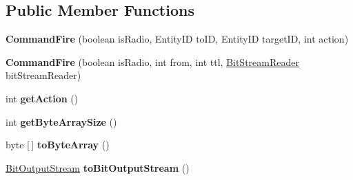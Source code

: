 \subsection*{Public Member Functions}
\begin{DoxyCompactItemize}
\item 
\hypertarget{classadf_1_1agent_1_1communication_1_1standard_1_1bundle_1_1topdown_1_1CommandFire_a096f6d1f59e59d3e50d4aaa81627ffe5}{}\label{classadf_1_1agent_1_1communication_1_1standard_1_1bundle_1_1topdown_1_1CommandFire_a096f6d1f59e59d3e50d4aaa81627ffe5} 
{\bfseries Command\+Fire} (boolean is\+Radio, Entity\+ID to\+ID, Entity\+ID target\+ID, int action)
\item 
\hypertarget{classadf_1_1agent_1_1communication_1_1standard_1_1bundle_1_1topdown_1_1CommandFire_a7a3979249cfbe7491fcb6a25ba3b7260}{}\label{classadf_1_1agent_1_1communication_1_1standard_1_1bundle_1_1topdown_1_1CommandFire_a7a3979249cfbe7491fcb6a25ba3b7260} 
{\bfseries Command\+Fire} (boolean is\+Radio, int from, int ttl, \hyperlink{classadf_1_1component_1_1communication_1_1util_1_1BitStreamReader}{Bit\+Stream\+Reader} bit\+Stream\+Reader)
\item 
\hypertarget{classadf_1_1agent_1_1communication_1_1standard_1_1bundle_1_1topdown_1_1CommandFire_ac5b6f3774aba7df932872d62aa5a4562}{}\label{classadf_1_1agent_1_1communication_1_1standard_1_1bundle_1_1topdown_1_1CommandFire_ac5b6f3774aba7df932872d62aa5a4562} 
int {\bfseries get\+Action} ()
\item 
\hypertarget{classadf_1_1agent_1_1communication_1_1standard_1_1bundle_1_1topdown_1_1CommandFire_a31d8677dededcf55229510bb013d4258}{}\label{classadf_1_1agent_1_1communication_1_1standard_1_1bundle_1_1topdown_1_1CommandFire_a31d8677dededcf55229510bb013d4258} 
int {\bfseries get\+Byte\+Array\+Size} ()
\item 
\hypertarget{classadf_1_1agent_1_1communication_1_1standard_1_1bundle_1_1topdown_1_1CommandFire_abbcfbbd10848d3ec6d5ed0ce3f6074c0}{}\label{classadf_1_1agent_1_1communication_1_1standard_1_1bundle_1_1topdown_1_1CommandFire_abbcfbbd10848d3ec6d5ed0ce3f6074c0} 
byte \mbox{[}$\,$\mbox{]} {\bfseries to\+Byte\+Array} ()
\item 
\hypertarget{classadf_1_1agent_1_1communication_1_1standard_1_1bundle_1_1topdown_1_1CommandFire_a4e69239f9f8c5c6ad6b381ac5eff2ded}{}\label{classadf_1_1agent_1_1communication_1_1standard_1_1bundle_1_1topdown_1_1CommandFire_a4e69239f9f8c5c6ad6b381ac5eff2ded} 
\hyperlink{classadf_1_1component_1_1communication_1_1util_1_1BitOutputStream}{Bit\+Output\+Stream} {\bfseries to\+Bit\+Output\+Stream} ()

\end{DoxyCompactItemize}
